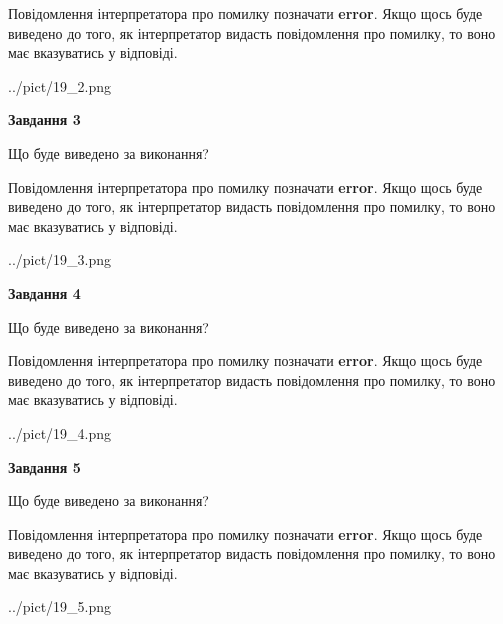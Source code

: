 \documentclass[12pt, ukrainian]{article}
\begin{document}
{\begin {large}
Повідомлення інтерпретатора про помилку позначати \textbf{error}.
Якщо щось буде виведено до того, як інтерпретатор видасть повідомлення про помилку, 
то воно має вказуватись у відповіді. \par


\begin{center}
	{../pict/19_2.png}
\end{center}
\newpage

{\begin {center}\textbf{Завдання 3}\end {center}}\par
Що буде виведено за виконання?

Повідомлення інтерпретатора про помилку позначати \textbf{error}.
Якщо щось буде виведено до того, як інтерпретатор видасть повідомлення про помилку, 
то воно має вказуватись у відповіді. \par


\begin{center}
	{../pict/19_3.png}
\end{center}
\newpage

{\begin {center}\textbf{Завдання 4}\end {center}}\par
Що буде виведено за виконання?

Повідомлення інтерпретатора про помилку позначати \textbf{error}.
Якщо щось буде виведено до того, як інтерпретатор видасть повідомлення про помилку, 
то воно має вказуватись у відповіді. \par


\begin{center}
	{../pict/19_4.png}
\end{center}
\newpage

{\begin {center}\textbf{Завдання 5}\end {center}}\par
Що буде виведено за виконання?

Повідомлення інтерпретатора про помилку позначати \textbf{error}.
Якщо щось буде виведено до того, як інтерпретатор видасть повідомлення про помилку, 
то воно має вказуватись у відповіді. \par


\begin{center}
	{../pict/19_5.png}
\end{center}
\newpage


\end{large}}
\end{document}
